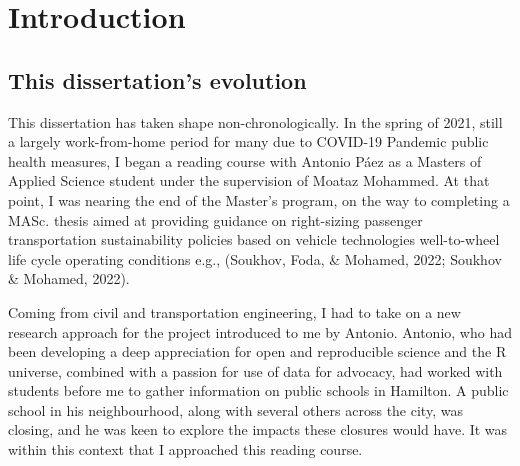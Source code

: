 \documentclass[
11pt, %
oneside, %
english, %
singlespacing, %
]{macthesis} %
\begin{document}
\label{lastoffront}
\clearpage


\mainmatter %
\pagestyle{thesis}
\chapter*{Introduction}\label{introduction}

\section{This dissertation's evolution}\label{this-dissertations-evolution}

This dissertation has taken shape non-chronologically. In the spring of 2021, still a largely work-from-home period for many due to COVID-19 Pandemic public health measures, I began a reading course with Antonio Páez as a Masters of Applied Science student under the supervision of Moataz Mohammed. At that point, I was nearing the end of the Master's program, on the way to completing a MASc. thesis aimed at providing guidance on right-sizing passenger transportation sustainability policies based on vehicle technologies well-to-wheel life cycle operating conditions e.g., (Soukhov, Foda, \& Mohamed, 2022; Soukhov \& Mohamed, 2022).

Coming from civil and transportation engineering, I had to take on a new research approach for the project introduced to me by Antonio. Antonio, who had been developing a deep appreciation for open and reproducible science and the R universe, combined with a passion for use of data for advocacy, had worked with students before me to gather information on public schools in Hamilton. A public school in his neighbourhood, along with several others across the city, was closing, and he was keen to explore the impacts these closures would have. It was within this context that I approached this reading course.
\end{document}
